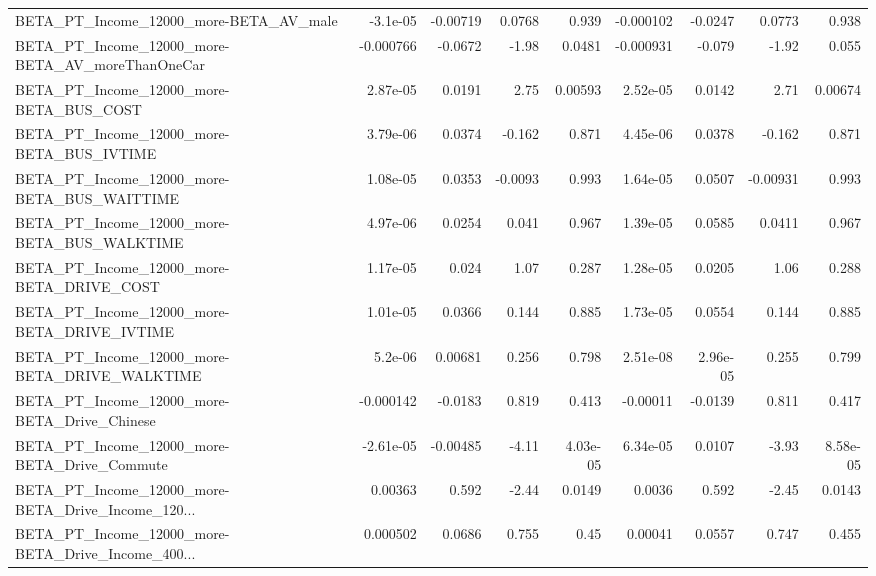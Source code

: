 \begin{tabular}{lrrrrrrrr}
BETA\_PT\_Income\_12000\_more-BETA\_AV\_male             &    -3.1e-05 &     -0.00719 &    0.0768 &    0.939 &  -0.000102 &     -0.0247 &       0.0773 &         0.938 \\
BETA\_PT\_Income\_12000\_more-BETA\_AV\_moreThanOneCar   &   -0.000766 &      -0.0672 &     -1.98 &   0.0481 &  -0.000931 &      -0.079 &        -1.92 &         0.055 \\
BETA\_PT\_Income\_12000\_more-BETA\_BUS\_COST            &    2.87e-05 &       0.0191 &      2.75 &  0.00593 &   2.52e-05 &      0.0142 &         2.71 &       0.00674 \\
BETA\_PT\_Income\_12000\_more-BETA\_BUS\_IVTIME          &    3.79e-06 &       0.0374 &    -0.162 &    0.871 &   4.45e-06 &      0.0378 &       -0.162 &         0.871 \\
BETA\_PT\_Income\_12000\_more-BETA\_BUS\_WAITTIME        &    1.08e-05 &       0.0353 &   -0.0093 &    0.993 &   1.64e-05 &      0.0507 &     -0.00931 &         0.993 \\
BETA\_PT\_Income\_12000\_more-BETA\_BUS\_WALKTIME        &    4.97e-06 &       0.0254 &     0.041 &    0.967 &   1.39e-05 &      0.0585 &       0.0411 &         0.967 \\
BETA\_PT\_Income\_12000\_more-BETA\_DRIVE\_COST          &    1.17e-05 &        0.024 &      1.07 &    0.287 &   1.28e-05 &      0.0205 &         1.06 &         0.288 \\
BETA\_PT\_Income\_12000\_more-BETA\_DRIVE\_IVTIME        &    1.01e-05 &       0.0366 &     0.144 &    0.885 &   1.73e-05 &      0.0554 &        0.144 &         0.885 \\
BETA\_PT\_Income\_12000\_more-BETA\_DRIVE\_WALKTIME      &     5.2e-06 &      0.00681 &     0.256 &    0.798 &   2.51e-08 &    2.96e-05 &        0.255 &         0.799 \\
BETA\_PT\_Income\_12000\_more-BETA\_Drive\_Chinese       &   -0.000142 &      -0.0183 &     0.819 &    0.413 &   -0.00011 &     -0.0139 &        0.811 &         0.417 \\
BETA\_PT\_Income\_12000\_more-BETA\_Drive\_Commute       &   -2.61e-05 &     -0.00485 &     -4.11 & 4.03e-05 &   6.34e-05 &      0.0107 &        -3.93 &      8.58e-05 \\
BETA\_PT\_Income\_12000\_more-BETA\_Drive\_Income\_120... &     0.00363 &        0.592 &     -2.44 &   0.0149 &     0.0036 &       0.592 &        -2.45 &        0.0143 \\
BETA\_PT\_Income\_12000\_more-BETA\_Drive\_Income\_400... &    0.000502 &       0.0686 &     0.755 &     0.45 &    0.00041 &      0.0557 &        0.747 &         0.455 \\

\end{tabular}
